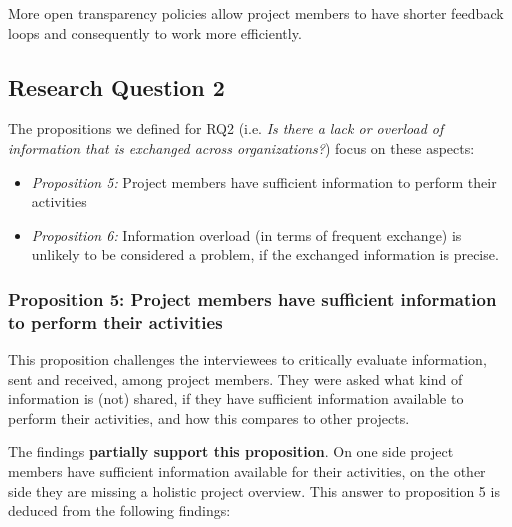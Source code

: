  More open transparency policies allow project members to have shorter feedback loops and consequently to work more efficiently.

\subsection{Research Question 2}\label{sec:ResearchQuestion2}

The propositions we defined for  
RQ2 (i.e. {\em Is there a lack or overload of information that is exchanged across organizations?}) focus on these aspects:

\begin{itemize}
\item %
\emph{Proposition 5:} Project members have sufficient information to perform their activities
\item %
\emph{Proposition 6:} Information overload (in terms of frequent exchange) is unlikely to be considered a problem, if the exchanged information is precise.
\end{itemize}

\subsubsection{Proposition 5: Project members have sufficient information to perform their activities}

%
%
%

This proposition challenges the interviewees to critically evaluate information, sent and received, among project members. 
They were asked what kind of information is (not) shared, if they have sufficient information available to perform their activities, and how this compares to other projects. 

The findings {\bf partially support this proposition}. On one side project members have sufficient information available for their activities, on the other side they are missing a holistic project overview. This answer to proposition 5 is deduced from the following findings:

